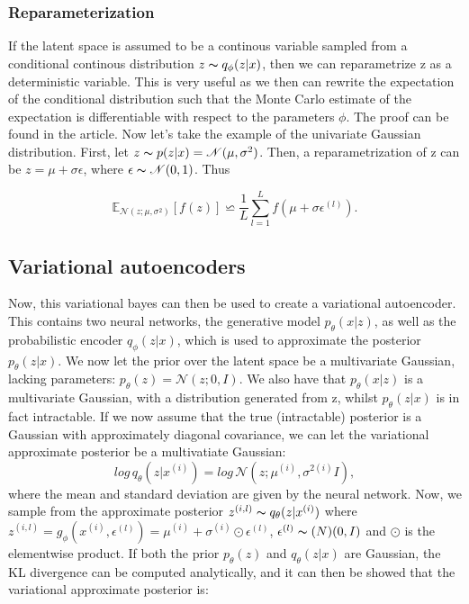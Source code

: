 \subsubsection*{Reparameterization}\label{sec:reparameterization}
If the latent space is assumed to be a continous variable sampled from a conditional continous distribution 
$z \thicksim q_{\phi}(z|x)$, then we can reparametrize z as a deterministic variable. This is very useful as 
we then can rewrite the expectation of the conditional distribution such that the Monte Carlo estimate of 
the expectation is differentiable with respect to the parameters $\phi$. The proof can be found in the article\cite{VAE}.  
Now let's take the example of the univariate Gaussian distribution. First, let $z \thicksim p(z|x) = \mathcal{N}(\mu, \sigma^2)$. 
Then, a reparametrization of z can be $z = \mu + \sigma\epsilon$, where $\epsilon \thicksim \mathcal{N}(0,1)$. 
Thus 

\begin{equation*}
    \mathbb{E}_{\mathcal{N}(z; \mu, \sigma^2)}[f(z)] \backsimeq  \frac{1}{L}\sum_{l=1}^L f(\mu + \sigma\epsilon^{(l)}).
\end{equation*}

\subsection*{Variational autoencoders}
Now, this variational bayes can then be used to create a variational autoencoder. This contains two neural networks, the generative model $p_{\theta}(x|z)$,
as well as the probabilistic encoder $q_{\phi}(z|x)$, which is used to approximate the posterior $p_{\theta}(z|x)$. We now let the prior over 
the latent space be a multivariate Gaussian, lacking parameters: $p_{\theta}(z) = \mathcal{N}(z;0,I)$. We also have that $p_{\theta}(x|z)$ is a multivariate Gaussian,
with a distribution generated from z, whilst $p_{\theta}(z|x)$ is in fact intractable. If we now assume that the true (intractable) posterior 
is a Gaussian with approximately diagonal covariance, we can let the variational approximate posterior be a multivatiate Gaussian:
\begin{equation}
    log\, q_{\theta}(z|x^{(i)}) = log\, \mathcal{N}(z;\mu^{(i)},\sigma^{2(i)}I),
\end{equation}
where the mean and standard deviation are given by the neural network. Now, we sample from the approximate posterior $z^{(i,l)} \thicksim q_{\theta}(z|x^{(i)})$
where $z^{(i,l)} = g_{\phi}(x^{(i)}, \epsilon^{(l)}) = \mu^{(i)} + \sigma^{(i)} \odot \epsilon^{(l)}$, $\epsilon^{(l)} \thicksim \mathcal(N)(0,I)$ and $\odot$
is the elementwise product. If both the prior $p_{\theta}(z)$ and $q_{\theta}(z|x)$ are Gaussian, the KL divergence can be computed analytically, and it 
can then be showed\cite{VAE} that the variational approximate posterior is:

